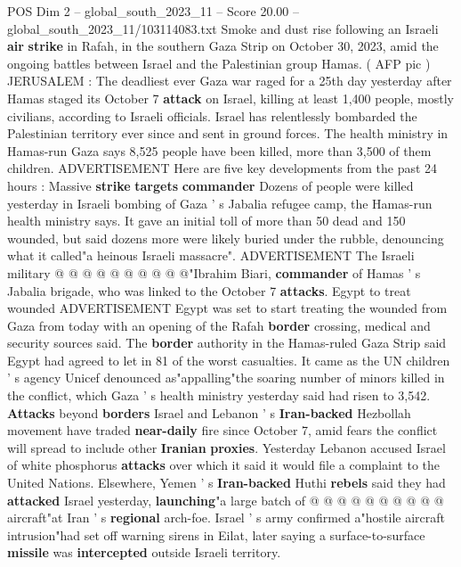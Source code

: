 \begin{textsample}{POS Dim 2 – global\_south\_2023\_11 – Score 20.00 – global\_south\_2023\_11/103114083.txt}  \label{ex:f2_pos_218}
Smoke and dust rise following an Israeli \textbf{air} \textbf{strike} in Rafah, in the southern Gaza Strip on October 30, 2023, amid the ongoing battles between Israel and the Palestinian group Hamas. ( AFP pic ) JERUSALEM : The deadliest ever Gaza war raged for a 25th day yesterday after Hamas staged its October 7 \textbf{attack} on Israel, killing at least 1,400 people, mostly civilians, according to Israeli officials.
Israel has relentlessly bombarded the Palestinian territory ever since and sent in ground forces.
The health ministry in Hamas-run Gaza says 8,525 people have been killed, more than 3,500 of them children.
ADVERTISEMENT Here are five key developments from the past 24 hours : Massive \textbf{strike} \textbf{targets} \textbf{commander} Dozens of people were killed yesterday in Israeli bombing of Gaza ' s Jabalia refugee camp, the Hamas-run health ministry says.
It gave an initial toll of more than 50 dead and 150 wounded, but said dozens more were likely buried under the rubble, denouncing what it called"a heinous Israeli massacre".
ADVERTISEMENT The Israeli military @ @ @ @ @ @ @ @ @ @"Ibrahim Biari, \textbf{commander} of Hamas ' s Jabalia brigade, who was linked to the October 7 \textbf{attacks}.
Egypt to treat wounded ADVERTISEMENT Egypt was set to start treating the wounded from Gaza from today with an opening of the Rafah \textbf{border} crossing, medical and security sources said.
The \textbf{border} authority in the Hamas-ruled Gaza Strip said Egypt had agreed to let in 81 of the worst casualties.
It came as the UN children ' s agency Unicef denounced as"appalling"the soaring number of minors killed in the conflict, which Gaza ' s health ministry yesterday said had risen to 3,542. \textbf{Attacks} beyond \textbf{borders} Israel and Lebanon ' s \textbf{Iran-backed} Hezbollah movement have traded \textbf{near-daily} fire since October 7, amid fears the conflict will spread to include other \textbf{Iranian} \textbf{proxies}.
Yesterday Lebanon accused Israel of white phosphorus \textbf{attacks} over which it said it would file a complaint to the United Nations.
Elsewhere, Yemen ' s \textbf{Iran-backed} Huthi \textbf{rebels} said they had \textbf{attacked} Israel yesterday, \textbf{launching}"a large batch of @ @ @ @ @ @ @ @ @ @ aircraft"at Iran ' s \textbf{regional} arch-foe.
Israel ' s army confirmed a"hostile aircraft intrusion"had set off warning sirens in Eilat, later saying a surface-to-surface \textbf{missile} was \textbf{intercepted} outside Israeli territory.

\end{textsample}
